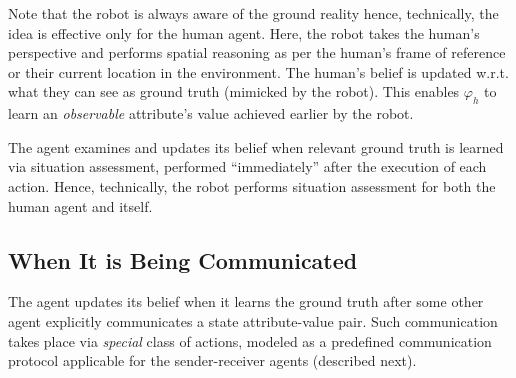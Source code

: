 \documentclass[letterpaper]{article} %
\begin{document}
Note that the robot is always aware of the ground reality hence, technically, the idea 
is effective only for the human agent. Here, the robot takes the human's perspective and performs spatial reasoning as per the human's frame of reference or their current location in the environment. 
The human's belief is updated w.r.t. what they can see as ground truth (mimicked by the robot).
This enables $\varphi_h$ to learn an \textit{observable} attribute's value achieved earlier by the robot.
% 

The agent examines and updates its belief when relevant ground truth is learned via situation assessment, performed ``immediately'' after the execution of each action. Hence, technically, the robot performs situation assessment for both the human agent and itself.

\subsection{When It is Being Communicated}
The agent updates its belief when it learns the ground truth after some other agent explicitly communicates a state attribute-value pair. 
Such communication takes place via \textit{special} class of actions, modeled as a predefined communication protocol applicable for the sender-receiver agents (described next). 
\end{document}
